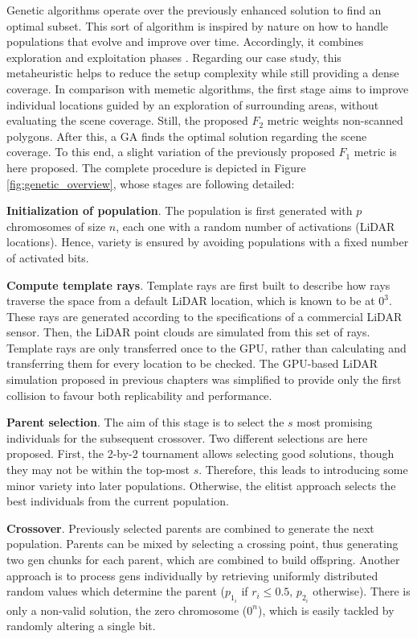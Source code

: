 Genetic algorithms operate over the previously enhanced solution to find an optimal subset. This sort of algorithm is inspired by nature on how to handle populations that evolve and improve over time. Accordingly, it combines exploration and exploitation phases \cite{vannucci_genetic_2020}. Regarding our case study, this metaheuristic helps to reduce the setup complexity while still providing a dense coverage. In comparison with memetic algorithms, the first stage aims to improve individual locations guided by an exploration of surrounding areas, without evaluating the scene coverage. Still, the proposed $F_2$ metric weights non-scanned polygons. After this, a GA finds the optimal solution regarding the scene coverage. 
To this end, a slight variation of the previously proposed $F_1$ metric is here proposed. 
The complete procedure is depicted in Figure \ref{fig:genetic_overview}, whose stages are following detailed:

\textbf{Initialization of population}. The population is first generated with $p$ chromosomes of size $n$, each one with a random number of activations (LiDAR locations). Hence, variety is ensured by avoiding populations with a fixed number of activated bits.

\textbf{Compute template rays}. Template rays are first built to describe how rays traverse the space from a default LiDAR location, which is known to be at $0^3$. These rays are generated according to the specifications of a commercial LiDAR sensor. Then, the LiDAR point clouds are simulated from this set of rays. Template rays are only transferred once to the GPU, rather than calculating and transferring them for every location to be checked. The GPU-based LiDAR simulation proposed in previous chapters was simplified to provide only the first collision to favour both replicability and performance. 

\textbf{Parent selection}. The aim of this stage is to select the $s$ most promising individuals for the subsequent crossover. Two different selections are here proposed. First, the 2-by-2 tournament allows selecting good solutions, though they may not be within the top-most $s$. Therefore, this leads to introducing some minor variety into later populations. Otherwise, the elitist approach selects the best individuals from the current population.

\textbf{Crossover}. Previously selected parents are combined to generate the next population. Parents can be mixed by selecting a crossing point, thus generating two gen chunks for each parent, which are combined to build offspring. Another approach is to process gens individually by retrieving uniformly distributed random values which determine the parent ($p_{1_{i}}$ if $r_i \leq 0.5$, $p_{2_{i}}$ otherwise). There is only a non-valid solution, the zero chromosome ($0^n$), which is easily tackled by randomly altering a single bit.

